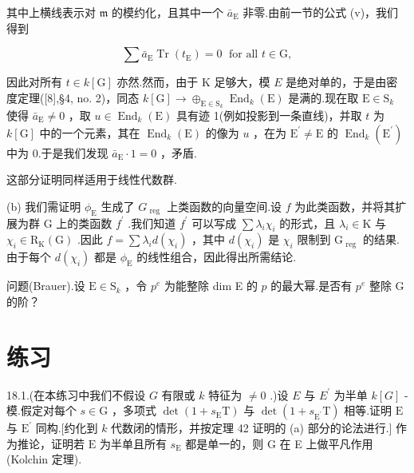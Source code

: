 \documentclass[10pt]{article}
\begin{document}
其中上横线表示对 \(\mathfrak{m}\) 的模约化，且其中一个 \({\bar{a}}_{\mathrm{E}}\) 非零.由前一节的公式 (v)，我们得到

\[
\sum {\bar{a}}_{\mathrm{E}}\operatorname{Tr}\left( {t}_{\mathrm{E}}\right)  = 0\;\text{ for all }t \in  \mathrm{G},
\]

因此对所有 \(t \in  k\left\lbrack  \mathrm{G}\right\rbrack\) 亦然.然而，由于 \(\mathrm{K}\) 足够大，模 \(E\) 是绝对单的，于是由密度定理([8],§4, no. 2)，同态 \(k\left\lbrack  \mathrm{G}\right\rbrack   \rightarrow  { \oplus  }_{\mathrm{E} \in  {\mathrm{S}}_{k}}{\operatorname{End}}_{k}\left( \mathrm{E}\right)\) 是满的.现在取 \(\mathrm{E} \in  {\mathrm{S}}_{k}\) 使得 \({\bar{a}}_{\mathrm{E}} \neq  0\) ，取 \(u \in  {\operatorname{End}}_{k}\left( \mathrm{E}\right)\) 具有迹 1(例如投影到一条直线)，并取 \(t\) 为 \(k\left\lbrack  \mathrm{G}\right\rbrack\) 中的一个元素，其在 \({\operatorname{End}}_{k}\left( \mathrm{E}\right)\) 的像为 \(u\) ，在为 \({\mathrm{E}}^{\prime } \neq  \mathrm{E}\) 的 \({\operatorname{End}}_{k}\left( {\mathrm{E}}^{\prime }\right)\) 中为 0.于是我们发现 \({\bar{a}}_{\mathrm{E}} \cdot  1 = 0\) ，矛盾.

这部分证明同样适用于线性代数群.

(b) 我们需证明 \({\phi }_{\mathrm{E}}\) 生成了 \({G}_{\text{ reg }}\) 上类函数的向量空间.设 \(f\) 为此类函数，并将其扩展为群 G 上的类函数 \({f}^{\prime }\) .我们知道 \({f}^{\prime }\) 可以写成 \(\sum {\lambda }_{i}{\chi }_{i}\) 的形式，且 \({\lambda }_{i} \in  \mathrm{K}\) 与 \({\chi }_{i} \in  {\mathrm{R}}_{\mathrm{K}}\left( \mathrm{G}\right)\) .因此 \(f = \sum {\lambda }_{i}d\left( {\chi }_{i}\right)\) ，其中 \(d\left( {\chi }_{i}\right)\) 是 \({\chi }_{i}\) 限制到 \({\mathrm{G}}_{\text{ reg }}\) 的结果.由于每个 \(d\left( {\chi }_{i}\right)\) 都是 \({\phi }_{\mathrm{E}}\) 的线性组合，因此得出所需结论.

问题(Brauer).设 \(\mathrm{E} \in  {\mathrm{S}}_{k}\) ，令 \({p}^{e}\) 为能整除 dim E 的 \(p\) 的最大幂.是否有 \({p}^{e}\) 整除 G 的阶？

\section*{练习}

18.1.(在本练习中我们不假设 \(G\) 有限或 \(k\) 特征为 \(\neq  0\) .)设 \(E\) 与 \({E}^{\prime }\) 为半单 \(k\left\lbrack  G\right\rbrack\) -模.假定对每个 \(s \in  \mathrm{G}\) ，多项式 \(\det \left( {1 + {s}_{\mathrm{E}}\mathrm{T}}\right)\) 与 \(\det \left( {1 + {s}_{{\mathrm{E}}^{\prime }}\mathrm{T}}\right)\) 相等.证明 \(\mathrm{E}\) 与 \({\mathrm{E}}^{\prime }\) 同构.[约化到 \(k\) 代数闭的情形，并按定理 42 证明的 (a) 部分的论法进行.] 作为推论，证明若 \(\mathrm{E}\) 为半单且所有 \({s}_{\mathrm{E}}\) 都是单一的，则 \(\mathrm{G}\) 在 E 上做平凡作用(Kolchin 定理).
\end{document}

